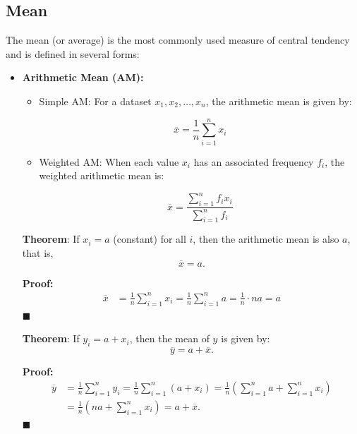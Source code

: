 \documentclass[twoside]{book}
\begin{document}
\subsection{Mean}

The mean (or average) is the most commonly used measure of central tendency and is defined in several forms:

\begin{itemize}
    \item \textbf{Arithmetic Mean (AM):} 
    \begin{itemize}
        \item Simple AM: For a dataset \( x_1, x_2, \dots, x_n \), the arithmetic mean is given by:
    \begin{textbox}
    \[
    \overline{x} = \dfrac{1}{n} \sum_{i=1}^{n} x_i
    \]
    \end{textbox}
    \item Weighted AM: When each value \( x_i \) has an associated frequency \( f_i \), the weighted arithmetic mean is:
    \begin{textbox}
    \[
    \overline{x} = \dfrac{\sum_{i=1}^{n} f_i x_i}{\sum_{i=1}^{n} f_i}
    \]
    \end{textbox}
    \end{itemize}

\begin{textbox}
        \textbf{Theorem}: If \( x_i = a \) (constant) for all \( i \), then the arithmetic mean is also \( a \), that is,
\[
\overline{x} = a.
\]
\end{textbox}

\textbf{Proof:}
\begin{align*}
\overline{x} &= \frac{1}{n} \sum_{i=1}^n x_i 
       = \frac{1}{n} \sum_{i=1}^n a = \frac{1}{n} \cdot n a = a
\end{align*}
\hfill $\blacksquare$

\begin{textbox}
\textbf{Theorem}: If \( y_i = a + x_i \), then the mean of \( y \) is given by:
\[
\overline{y} = a + \overline{x}.
\]
\end{textbox}

\textbf{Proof:}
\begin{align*}
\overline{y} &= \frac{1}{n} \sum_{i=1}^n y_i = \frac{1}{n} \sum_{i=1}^n (a + x_i) = \frac{1}{n} \left( \sum_{i=1}^n a + \sum_{i=1}^n x_i \right) \\
       &= \frac{1}{n} \left( n a + \sum_{i=1}^n x_i \right) = a + \overline{x}.
\end{align*}
\hfill $\blacksquare$


\end{itemize}
\end{document}
